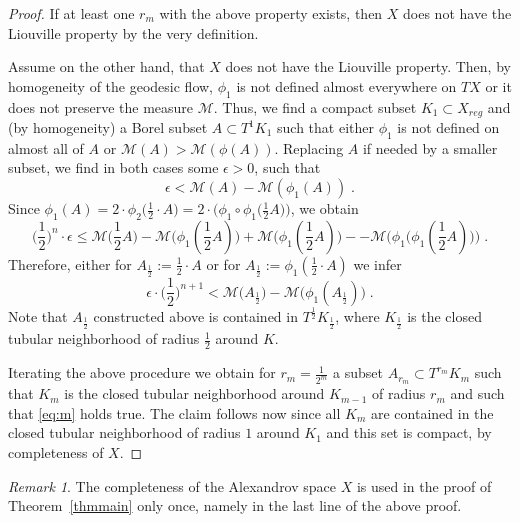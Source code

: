 \documentclass[12pt,leqno]{amsart}
\numberwithin{equation}{section}
\theoremstyle{definition}
\theoremstyle{remark}
\newtheorem{rem}[thm]{Remark}
\newcommand{\tref}[1]{Theorem~\ref{#1}}
\begin{document}
\begin{proof}
If at least one $r_m$ with the above property exists, then $X$  does not have the Liouville property by the very definition.

Assume on the other hand, that $X$ does not have the Liouville property. Then,  by homogeneity of the geodesic flow,  $\phi _1$ is not defined almost everywhere on $TX$ or it does not preserve the measure $\mathcal M$. Thus, we find a compact subset $K_1\subset X_{reg}$ and (by homogeneity) a Borel subset $A\subset T^1 K_1$ such that either $\phi_1$ is not defined on almost all of $A$ or $\mathcal M (A) > \mathcal M(\phi (A))$.  Replacing $A$
if needed by a smaller  subset, we find in both cases some $\epsilon >0$, such that   $$\epsilon < \mathcal M (A) - \mathcal M(\phi_1 (A)) \; .$$
Since $\phi_1 (A)=2\cdot \phi _2 \Big (\frac 1 2 \cdot A \Big)=2\cdot \Big(\phi _1 \circ \phi_1 \Big (\frac 1 2 A \Big ) \Big )$,
we obtain
$$\Big(\frac 1 2 \Big )^n \cdot \epsilon \leq  \mathcal M \big(\frac 1 2 A \big) - \mathcal M \big( \phi_1 (\frac 1 2 A ) \big) + \mathcal M \big(\phi_1 (\frac 1 2 A )\big)-
 - \mathcal M\big (\phi_1 \big (\phi _1 (\frac 1 2 A )\big) \big) \; .$$
Therefore,  either for $A_{\frac 1 2} := \frac 1 2  \cdot A$ or for $A_{\frac 1 2} := \phi_1 (\frac 1 2 \cdot A)$ we infer
$$\epsilon \cdot \Big(\frac 1 2 \Big )^{n+1}  < \mathcal M \big(A _{\frac 1 2} \big) - \mathcal M \big( \phi_1 (A _{\frac 1 2}) \big) \; .$$
Note that $A_{\frac 1 2}$ constructed above is contained in $T^{\frac 1 2} K_{\frac 1 2}$, where $K _{\frac 1 2}$ is the closed tubular neighborhood  of
radius $\frac 1 2$ around $K$.

Iterating the above procedure we obtain  for $r_m =\frac 1 {2^m}$   a subset $A_{r_m} \subset T^{r_m} K_m$  such that $K_m$ is the closed tubular neighborhood around $K_{m-1}$ of radius $r_m$ and such that \eqref{eq:m} holds true.  The claim follows now since all $K_m$ are contained in the closed tubular neighborhood of radius $1$ around $K_1$ and this set is compact, by completeness of $X$.
\end{proof}


\begin{rem}
The completeness of the Alexandrov space $X$ is used in the proof of \tref{thmmain} only once, namely in the last line of the above proof.
\end{rem}
\end{document}
